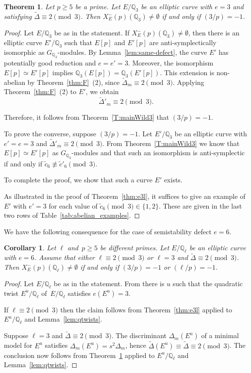 \documentclass[12pt]{amsart}
\numberwithin{equation}{section}
\newtheorem{theorem}[equation]{Theorem}
\newtheorem{corollary}[equation]{Corollary}
\theoremstyle{definition}
\newcommand{\Q}{\mathbb{Q}}
\newcommand{\Xp}{X_E^{-}(p)}
\begin{document}
\begin{theorem}\label{thm:e3l3}
	Let $p \geq 5$ be a prime. Let $E/\Q_3$ be an elliptic curve with $e=3$ and satisfying $\tilde{\Delta}\equiv 2 \pmod 3$.
  Then $\Xp(\Q_3)\neq \emptyset$ if and only if $(3/p) = -1$.
\end{theorem}
\begin{proof}
Let $E/\Q_3$ be as in the statement.
If $X_E^-(p)(\Q_3)\neq\emptyset$, then there is an elliptic curve
$E'/\Q_3$ such that $E[p]$ and $E'[p]$ are anti-symplectically
isomorphic as $G_{\Q_3}$-modules. By
Lemma~\ref{lem:same-defect}, the curve $E'$ has potentially good
reduction and $e=e'=3$. Moreover, the isomorphism
$E[p]\simeq E'[p]$ implies $\Q_3(E[p])=\Q_3(E'[p]).$
This extension is non-abelian by Theorem~\ref{thm:F}~(2), since $\widetilde\Delta_m\equiv2\pmod3.$
Applying Theorem~\ref{thm:F}~(2) to $E'$, we obtain
\[
    \tilde\Delta'_m\equiv2\pmod3.
\]

Therefore, it follows from Theorem~\ref{T:mainWild3} that $(3/p)= -1$.

To prove the converse, suppose $(3/p)=-1$.
Let $E'/\Q_3$ be an elliptic curve with $e'=e=3$ and $\tilde{\Delta}'_m \equiv 2 \pmod 3$. From Theorem~\ref{T:mainWild3} we know that
$E[p] \simeq E'[p]$ as $G_{\Q_3}$-modules
and that such an isomorphism is anti-symplectic if and only if
$\tilde{c}_6 \not\equiv \tilde{c}'_6 \pmod 3$.

To complete the proof, we show that such a curve $E'$ exists.

As illustrated in the proof of Theorem~\ref{thm:e3l}, it suffices to give an example of $E'$ with $e'=3$ for each value of $\tilde{c}_6 \pmod 3 \in\{1, 2\}$.
These are given in the last two rows of Table~\ref{tab:abelian_examples}.
\end{proof}

We have the following consequence for the case of semistability defect $e=6$.

\begin{corollary}\label{cor:e6}  Let $\ell$ and~$p \geq 5$ be different primes.
 Let $E/\Q_\ell$ be an elliptic curve with $e=6$.
 Assume that either $\ell \equiv 2 \pmod 3$ or $\ell = 3$ and $\tilde{\Delta} \equiv 2 \pmod 3$.
Then $\Xp(\Q_\ell)\neq \emptyset$ if and only if $(3/p)= -1$ or $(\ell / p) = -1$.
\end{corollary}
\begin{proof} 
Let $E/\Q_\ell$ be as in the statement.
From \cite[Lemmas 1 and 2]{symplectic} there is $u$ such that the quadratic twist $E^u/\Q_\ell$ of~$E/\Q_\ell$ satisfies $e(E^u) = 3$.

If $\ell \equiv 2 \pmod 3$ then the claim follows from Theorem~\ref{thm:e3l} applied to $E^u/\Q_\ell$ and Lemma~\ref{lem:qtwists}.

Suppose $\ell = 3$ and $\tilde{\Delta} \equiv 2 \pmod 3$. The discriminant $\Delta_m(E^u)$ of a minimal model for $E^u$
satisfies $\Delta_m(E^u) = s^2 \Delta_m$, hence $\tilde{\Delta}(E^u) \equiv \tilde{\Delta} \equiv 2 \pmod{3}$. The conclusion now follows from Theorem~\ref{thm:e3l3} applied to $E^u/\Q_\ell$ and Lemma~\ref{lem:qtwists}.
\end{proof}
\end{document}
